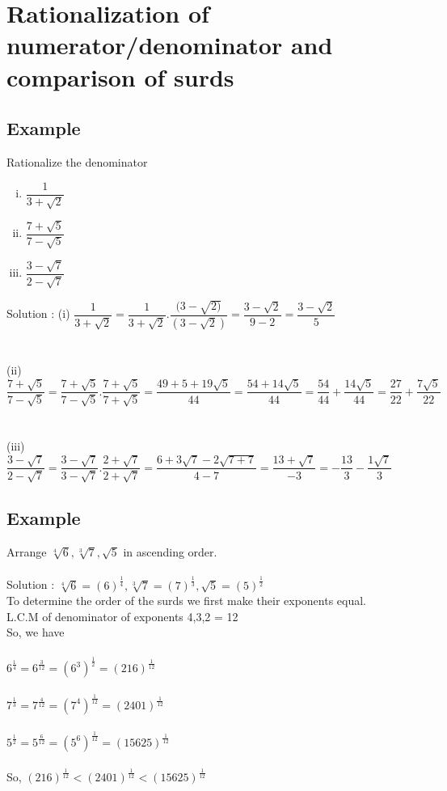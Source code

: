 \section{Rationalization of numerator/denominator and comparison of surds}

\subsection{Example}
Rationalize the denominator
\begin{multicols}{3}
\begin{enumerate}[(i)]
\item $\dfrac{1}{3+\sqrt{2}}$
\item $\dfrac{7+\sqrt{5}}{7-\sqrt{5}}$
\item $\dfrac{3-\sqrt{7}}{2-\sqrt{7}}$
\end{enumerate}
\end{multicols}
\noindent Solution : 
(i) $\dfrac{1}{3+\sqrt{2}} = \dfrac{1}{3+\sqrt{2}}.\dfrac{(3-\sqrt{2)}}{(3-\sqrt{2})} = \dfrac{3-\sqrt{2}}{9-2} = \dfrac{3-\sqrt{2}}{5}$\\\\\\
(ii) $\dfrac{7+\sqrt{5}}{7-\sqrt{5}} = \dfrac{7+\sqrt{5}}{7-\sqrt{5}}.\dfrac{7+\sqrt{5}}{7+\sqrt{5}} = \dfrac{49+5+19\sqrt{5}}{44} = \dfrac{54+14\sqrt{5}}{44}
=\dfrac{54}{44}+\dfrac{14\sqrt{5}}{44} = \dfrac{27}{22}+\dfrac{7\sqrt{5}}{22}$\\\\\\
(iii) $\dfrac{3-\sqrt{7}}{2-\sqrt{7}} = \dfrac{3-\sqrt{7}}{3-\sqrt{7}}.\dfrac{2+\sqrt{7}}{2+\sqrt{7}} = \dfrac{6+3\sqrt{7}-2\sqrt{7+7}}{4-7}
= \dfrac{13+\sqrt{7}}{-3} = -\dfrac{13}{3}-\dfrac{1\sqrt{7}}{3}$
\subsection{Example}
Arrange $\sqrt[4]{6}, \sqrt[3]{7}, \sqrt{5}$ in ascending order.\\\\
Solution : 
$\sqrt[4]{6} = (6)^{\frac{1}{4}}, \sqrt[3]{7} = (7)^{\frac{1}{3}}, \sqrt{5} = (5)^{\frac{1}{2}}$\\
To determine the order of the surds we first make their exponents equal.\\
L.C.M of denominator of exponents 4,3,2 = 12\\
So, we have\\\\
$ 6^{\frac{1}{4}} = 6^{\frac{3}{12}} = (6^3)^{\frac{1}{2}} = (216)^{\frac{1}{12}}$\\\\
$7^{\frac{1}{3}} = 7^{\frac{4}{12}} = (7^{4})^{\frac{1}{12}} = (2401)^{\frac{1}{12}}$\\\\
$5^{\frac{1}{2}} = 5^{\frac{6}{12}} = (5^6)^{\frac{1}{12}} = (15625)^{\frac{1}{12}}$\\\\
So, $(216)^{\frac{1}{12}} < (2401)^\frac{1}{12} < (15625)^\frac{1}{12} $

